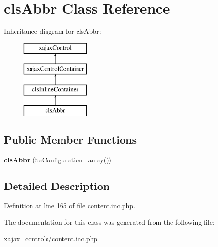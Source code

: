 \hypertarget{classclsAbbr}{
\section{clsAbbr Class Reference}
\label{classclsAbbr}
}
Inheritance diagram for clsAbbr:\begin{figure}[H]
\begin{center}
\leavevmode
\includegraphics[height=4.000000cm]{classclsAbbr}
\end{center}
\end{figure}
\subsection*{Public Member Functions}
\begin{DoxyCompactItemize}
\item 
\hypertarget{classclsAbbr_a4d4e09b66698056d9cf60923f1f497b1}{
{\bfseries clsAbbr} (\$aConfiguration=array())}
\label{classclsAbbr_a4d4e09b66698056d9cf60923f1f497b1}

\end{DoxyCompactItemize}


\subsection{Detailed Description}


Definition at line 165 of file content.inc.php.



The documentation for this class was generated from the following file:\begin{DoxyCompactItemize}
\item 
xajax\_\-controls/content.inc.php\end{DoxyCompactItemize}
